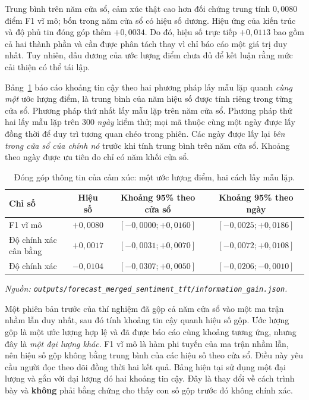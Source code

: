 \documentclass[12pt, a4paper, oneside]{report}
\begin{document}
Trung bình trên năm cửa sổ, cảm xúc thật cao hơn đối chứng trung tính $0{,}0080$ điểm F1 vĩ
mô; bốn trong năm cửa sổ có hiệu số dương. Hiệu ứng của kiến trúc và độ phủ tin đóng góp thêm
$+0{,}0034$. Do đó, hiệu số trực tiếp $+0{,}0113$ bao gồm cả hai thành phần và cần được
phân tách thay vì chỉ báo cáo một giá trị duy nhất. Tuy nhiên, dấu dương của ước lượng điểm
chưa đủ để kết luận rằng mức cải thiện có thể tái lập.

Bảng~\ref{tab:kq-ablation-ci} báo cáo khoảng tin cậy theo hai phương pháp lấy mẫu lặp quanh
\textit{cùng một} ước lượng điểm, là trung bình của năm hiệu số được tính riêng trong từng cửa sổ.
Phương pháp thứ nhất lấy mẫu lặp trên năm cửa sổ. Phương pháp thứ hai lấy mẫu lặp trên 300 \textit{ngày}
kiểm thử; mọi mã thuộc cùng một ngày được lấy đồng thời để duy trì tương quan chéo
trong phiên. Các ngày được lấy lại \textit{bên trong cửa sổ của chính nó} trước khi tính trung
bình trên năm cửa sổ. Khoảng theo ngày được ưu tiên do chỉ có năm khối cửa sổ.

\begin{table}[H]
  \centering
  \caption{Đóng góp thông tin của cảm xúc: một ước lượng điểm, hai cách lấy mẫu lặp.}
  \label{tab:kq-ablation-ci}
  \begin{tabular}{l c c c}
    \toprule
    Chỉ số & Hiệu số & Khoảng 95\% theo cửa sổ & Khoảng 95\% theo ngày \\
    \midrule
    F1 vĩ mô & $+0{,}0080$ & $[-0{,}0000; +0{,}0160]$ & $[-0{,}0025; +0{,}0186]$ \\
    Độ chính xác cân bằng & $+0{,}0017$ & $[-0{,}0031; +0{,}0070]$ & $[-0{,}0072; +0{,}0108]$ \\
    Độ chính xác & $-0{,}0104$ & $[-0{,}0307; +0{,}0050]$ & $[-0{,}0206; -0{,}0010]$ \\
    \bottomrule
  \end{tabular}
\noindent\textit{Nguồn: \texttt{outputs/forecast\_merged\_sentiment\_tft/information\_gain.json}.}
\end{table}

Một phiên bản trước của thí nghiệm đã gộp cả năm cửa sổ vào một ma trận nhầm lẫn duy nhất, sau đó
tính khoảng tin cậy quanh hiệu số gộp. Ước lượng gộp là một ước lượng hợp lệ và đã được
báo cáo cùng khoảng tương ứng, nhưng đây là \textit{một đại lượng khác}. F1 vĩ mô là hàm phi
tuyến của ma trận nhầm lẫn, nên hiệu số gộp không bằng trung bình của các hiệu số theo cửa sổ.
Điều này yêu cầu người đọc theo dõi đồng thời hai kết quả. Bảng hiện tại sử dụng một đại lượng và
gắn với đại lượng đó hai khoảng tin cậy. Đây là thay đổi về cách trình bày và \textbf{không} phải bằng chứng
cho thấy con số gộp trước đó không chính xác.
\end{document}
